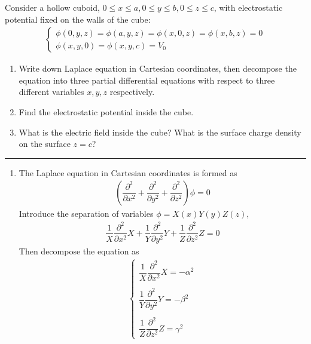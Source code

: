 \documentclass[a4paper,11pt]{article}
\begin{document}
\begin{enumerate}
    Consider a hollow cuboid, $0\leqslant x\leqslant a, 0\leqslant y\leqslant b,0\leqslant z\leqslant c$, with electrostatic potential fixed on the walls of the cube:
    \begin{eqnarray}
        \begin{cases}
            \phi(0,y,z)=\phi(a,y,z)=\phi(x,0,z)=\phi(x,b,z)=0 \\
            \phi(x,y,0)=\phi(x,y,c)=V_0 \nonumber
        \end{cases}
    \end{eqnarray}
    
    \begin{enumerate}
        \item Write down Laplace equation in Cartesian coordinates, then decompose the equation into three partial differential equations with respect to three different variables $x,y,z$ respectively.
        \item Find the electrostatic potential inside the cube.
        \item What is the electric field inside the cube? What is the surface charge density on the surface $z=c$?
    \end{enumerate}
    \rule[0pt]{6cm}{0.05em}
    \begin{enumerate}
        \item The Laplace equation in Cartesian coordinates is formed as
        \begin{eqnarray}
            \left(\dfrac{\partial^2}{\partial x^2}+\dfrac{\partial^2}{\partial y^2}+\dfrac{\partial^2}{\partial z^2}\right)\phi=0
        \end{eqnarray}
        Introduce the separation of variables $\phi=X(x)Y(y)Z(z)$,
        \begin{eqnarray}
            \dfrac{1}{X}\dfrac{\partial^2}{\partial x^2}X+\dfrac{1}{Y}\dfrac{\partial^2}{\partial y^2}Y+\dfrac{1}{Z}\dfrac{\partial^2}{\partial z^2}Z=0
        \end{eqnarray}
        Then decompose the equation as
        \begin{eqnarray}\label{eq6}
            \begin{cases}
                \dfrac{1}{X}\dfrac{\partial^2}{\partial x^2}X=-\alpha^2 \\
                \quad\\
                \dfrac{1}{Y}\dfrac{\partial^2}{\partial y^2}Y=-\beta^2 \\
                \quad\\
                \dfrac{1}{Z}\dfrac{\partial^2}{\partial z^2}Z=\gamma^2 

\end{cases}
\end{eqnarray}
\end{enumerate}
\end{enumerate}
\end{document}

